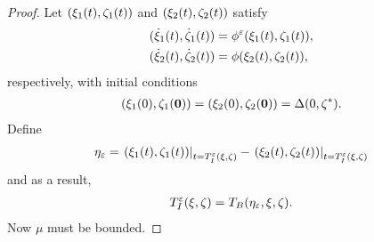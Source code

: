 \begin{proof}
  Let $(\xi_{1}(t), \zeta_{1}(t))$ and $(\xi_{2}(t), \zeta_{2}(t))$ satisfy
  \begin{align*}
    ({\dot {\xi}}_{1}(t), {\dot {\zeta}}_{1}(t)) &= \phi^{\varepsilon}(\xi_{1}(t), \zeta_{1}(t)),\\
    ({\dot {\xi}}_{2}(t), {\dot {\zeta}}_{2}(t)) &= \phi(\xi_{2}(t), \zeta_{2}(t)),
  \end{align*}
  respectively, with initial conditions
  \begin{align*}
    (\xi_{1}(0), \zeta_{1}({\mathbf 0})) = (\xi_{2}(0), \zeta_{2}({\mathbf 0})) = \Delta(0, \zeta^{*}).
  \end{align*}
  Define
  \begin{align}
    \label{eq:etaeps}
    \eta_{\varepsilon} = \left.(\xi_{1}(t), \zeta_{1}(t))\right|_{t = T_{I}^{\varepsilon}(\xi, \zeta)} -
    \left.(\xi_{2}(t), \zeta_{2}(t))\right|_{t = T_{I}^{\varepsilon}(\xi, \zeta)}
  \end{align}
  and as a result,
  \begin{align*}
    T_{I}^{\varepsilon}(\xi, \zeta) = T_{B}(\eta_{\varepsilon}, \xi, \zeta).
  \end{align*}
  Now $\mu$ must be bounded.


\end{proof}
